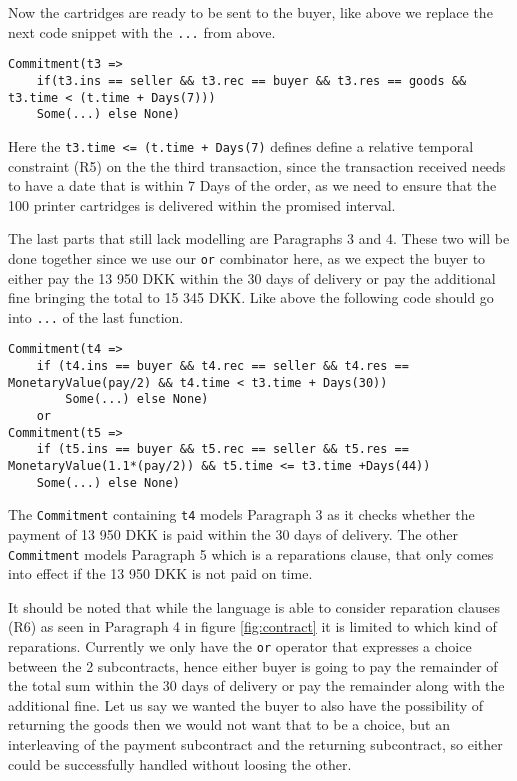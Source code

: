 \documentclass{ituthesis}
\begin{document}
Now the cartridges are ready to be sent to the buyer, like above we replace the next code snippet with the \texttt{...} from above.
\begin{lstlisting}
Commitment(t3 =>
    if(t3.ins == seller && t3.rec == buyer && t3.res == goods && t3.time < (t.time + Days(7)))
	Some(...) else None)
\end{lstlisting}
Here the \texttt{t3.time <= (t.time + Days(7)} defines define a relative temporal constraint (R5) on the the third transaction, since the transaction received needs to have a date that is within 7 Days of the order, as we need to ensure that the 100 printer cartridges is delivered within the promised interval.

The last parts that still lack modelling are Paragraphs 3 and 4. These two will be done together since we use our \texttt{or} combinator here, as we expect the buyer to either pay the 13 950 DKK within the 30 days of delivery or pay the additional fine bringing the total to 15 345 DKK. Like above the following code should go into \texttt{...} of the last function.
\begin{lstlisting}
Commitment(t4 =>
    if (t4.ins == buyer && t4.rec == seller && t4.res == MonetaryValue(pay/2) && t4.time < t3.time + Days(30))
		Some(...) else None)
    or
Commitment(t5 => 
    if (t5.ins == buyer && t5.rec == seller && t5.res == MonetaryValue(1.1*(pay/2)) && t5.time <= t3.time +Days(44))
    Some(...) else None)
\end{lstlisting}
%
The \texttt{Commitment} containing \texttt{t4} models Paragraph 3 as it checks whether the payment of 13 950 DKK is paid within the 30 days of delivery. The other \texttt{Commitment} models Paragraph 5 which is a reparations clause, that only comes into effect if the 13 950 DKK is not paid on time.

It should be noted that while the language is able to consider reparation clauses (R6) as seen in Paragraph 4 in figure \ref{fig:contract} it is limited to which kind of reparations. Currently we only have the \texttt{or} operator that expresses a choice between the 2 subcontracts, hence either buyer is going to pay the remainder of the total sum within the 30 days of delivery or pay the remainder along with the additional fine. Let us say we wanted the buyer to also have the possibility of returning the goods then we would not want that to be a choice, but an interleaving of the payment subcontract and the returning subcontract, so either could be successfully handled without loosing the other.
\end{document}
